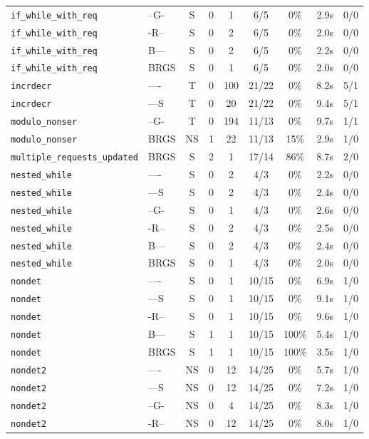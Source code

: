 \begin{tabular}{llccccccc}
\texttt{if_while_with_req} & --G- & S & 0 & 1 & 6/5 & 0\% & 2.9s & 0/0 \\
\texttt{if_while_with_req} & -R-- & S & 0 & 2 & 6/5 & 0\% & 2.0s & 0/0 \\
\texttt{if_while_with_req} & B--- & S & 0 & 2 & 6/5 & 0\% & 2.2s & 0/0 \\
\texttt{if_while_with_req} & BRGS & S & 0 & 1 & 6/5 & 0\% & 2.0s & 0/0 \\
\texttt{incrdecr} & ---- & T & 0 & 100 & 21/22 & 0\% & 8.2s & 5/1 \\
\texttt{incrdecr} & ---S & T & 0 & 20 & 21/22 & 0\% & 9.4s & 5/1 \\
\texttt{modulo_nonser} & --G- & T & 0 & 194 & 11/13 & 0\% & 9.7s & 1/1 \\
\texttt{modulo_nonser} & BRGS & NS & 1 & 22 & 11/13 & 15\% & 2.9s & 1/0 \\
\texttt{multiple_requests_updated} & BRGS & S & 2 & 1 & 17/14 & 86\% & 8.7s & 2/0 \\
\texttt{nested_while} & ---- & S & 0 & 2 & 4/3 & 0\% & 2.2s & 0/0 \\
\texttt{nested_while} & ---S & S & 0 & 2 & 4/3 & 0\% & 2.4s & 0/0 \\
\texttt{nested_while} & --G- & S & 0 & 1 & 4/3 & 0\% & 2.6s & 0/0 \\
\texttt{nested_while} & -R-- & S & 0 & 2 & 4/3 & 0\% & 2.5s & 0/0 \\
\texttt{nested_while} & B--- & S & 0 & 2 & 4/3 & 0\% & 2.4s & 0/0 \\
\texttt{nested_while} & BRGS & S & 0 & 1 & 4/3 & 0\% & 2.0s & 0/0 \\
\texttt{nondet} & ---- & S & 0 & 1 & 10/15 & 0\% & 6.9s & 1/0 \\
\texttt{nondet} & ---S & S & 0 & 1 & 10/15 & 0\% & 9.1s & 1/0 \\
\texttt{nondet} & -R-- & S & 0 & 1 & 10/15 & 0\% & 9.6s & 1/0 \\
\texttt{nondet} & B--- & S & 1 & 1 & 10/15 & 100\% & 5.4s & 1/0 \\
\texttt{nondet} & BRGS & S & 1 & 1 & 10/15 & 100\% & 3.5s & 1/0 \\
\texttt{nondet2} & ---- & NS & 0 & 12 & 14/25 & 0\% & 5.7s & 1/0 \\
\texttt{nondet2} & ---S & NS & 0 & 12 & 14/25 & 0\% & 7.2s & 1/0 \\
\texttt{nondet2} & --G- & NS & 0 & 4 & 14/25 & 0\% & 8.3s & 1/0 \\
\texttt{nondet2} & -R-- & NS & 0 & 12 & 14/25 & 0\% & 8.0s & 1/0 \\

\end{tabular}
